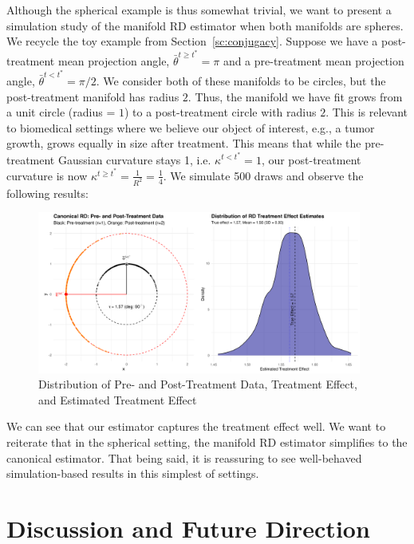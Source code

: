 \documentclass[twoside,11pt]{article}
\begin{document}
Although the spherical example is thus somewhat trivial, we want to present a simulation study of the manifold RD estimator when both manifolds are spheres. We recycle the toy example from Section~\ref{sc:conjugacy}. Suppose we have a post-treatment mean projection angle, $\bar{\theta}^{t \geq t^*} = \pi$ and a pre-treatment mean projection angle, $\bar{\theta}^{t < t^*} = \pi/2$. We consider both of these manifolds to be circles, but the post-treatment manifold has radius $2$. Thus, the manifold we have fit grows from a unit circle (radius = $1$) to a post-treatment circle with radius $2$. This is relevant to biomedical settings where we believe our object of interest, e.g., a tumor growth, grows equally in size after treatment. This means that while the pre-treatment Gaussian curvature stays 1, i.e. $\kappa^{t < t^*} = 1$, our post-treatment curvature is now $\kappa^{t \geq t^*} = \frac{1}{R^2} = \frac{1}{4}$. We simulate 500 draws and observe the following results: 


\begin{figure}[h!]
  \begin{center}
    \includegraphics[width=0.95\textwidth]{../fig/rd_sim.png}
  \end{center}
  \caption{Distribution of Pre- and Post-Treatment Data, Treatment Effect, and Estimated Treatment Effect}\label{fig:rd-sim}
\end{figure}

We can see that our estimator captures the treatment effect well. We want to reiterate that in the spherical setting, the manifold RD estimator simplifies to the canonical estimator. That being said, it is reassuring to see well-behaved simulation-based results in this simplest of settings. 

\section{Discussion and Future Direction}
\end{document}
